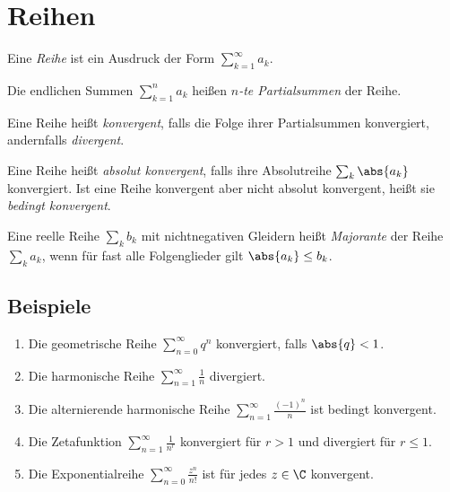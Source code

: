 \section{Reihen}

\begin{defn}
Eine \emph{Reihe} ist ein Ausdruck der Form $\sum \limits_{k=1}^\infty
a_k$.
\end{defn}
\begin{defn}
Die endlichen Summen $\sum \limits_{k=1}^n a_k$ heißen \emph{$n$-te
Partialsummen} der Reihe.
\end{defn}

\begin{defn}
Eine Reihe heißt \emph{konvergent}, falls die Folge ihrer Partialsummen
konvergiert, andernfalls \emph{divergent}.
\end{defn}

\begin{defn}
Eine Reihe heißt \emph{absolut konvergent}, falls ihre Absolutreihe $\sum_k
\abs{a_k}$ konvergiert. Ist eine Reihe konvergent aber nicht absolut konvergent, heißt sie
\emph{bedingt konvergent}.
\end{defn}

\begin{defn}
Eine reelle Reihe $\sum_k b_k$ mit nichtnegativen Gleidern heißt
\emph{Majorante} der Reihe $\sum_k a_k$, wenn für fast alle Folgenglieder gilt $\abs{a_k} \le
b_k$.
\end{defn}

\subsection{Beispiele}
\begin{enumerate}
  \item Die geometrische Reihe
  $\sum \limits_{n=0}^\infty q^n$ konvergiert, falls $\abs{q} < 1$.
  \item Die harmonische Reihe
  $\sum \limits_{n=1}^\infty \frac{1}{n}$ divergiert.
  \item Die alternierende harmonische Reihe
  $\sum \limits_{n=1}^\infty \frac{(-1)^n}{n}$ ist bedingt konvergent.
  \item Die Zetafunktion
  $\sum \limits_{n=1}^\infty \frac{1}{n^r}$ konvergiert für $r>1$ und
  divergiert für $r\le1$.
  \item Die Exponentialreihe
  $\sum \limits_{n=0}^\infty \frac{z^n}{n!}$ ist für jedes $z\in\C$
  konvergent.
\end{enumerate}

